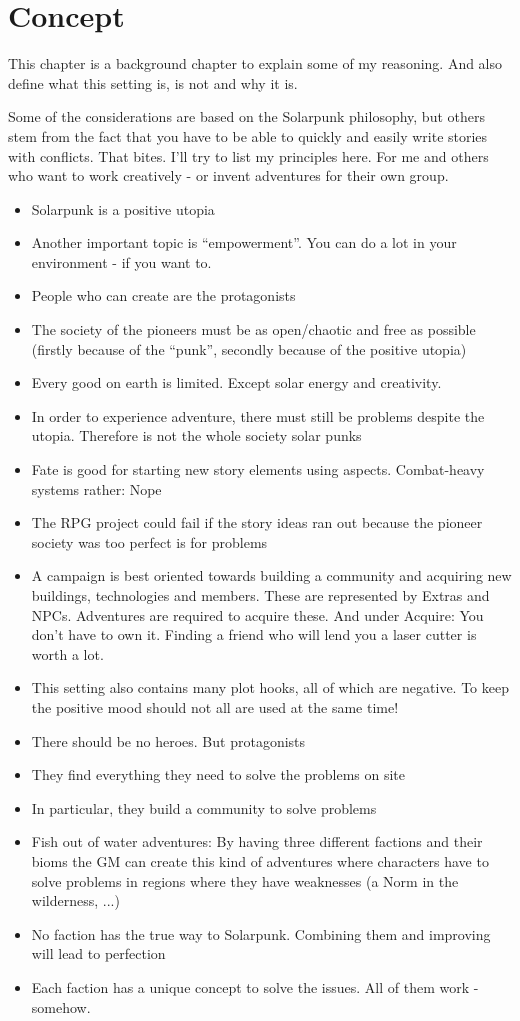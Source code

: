 \chapter{Concept}

This chapter is a background chapter to explain some of my reasoning. And also define what this setting is, is not and why it is.

Some of the considerations are based on the Solarpunk philosophy, but others stem from the fact that
you have to be able to quickly and easily write stories with conflicts. That bites. I'll try to list my principles here. For me and others who want to work creatively - or invent adventures for their own group.

\begin{itemize}
\item Solarpunk is a positive utopia
\item Another important topic is “empowerment”. You can do a lot in your environment - if you want to.
\item People who can create are the protagonists
\item The society of the pioneers must be as open/chaotic and free as possible (firstly because of the “punk”, secondly
because of the positive utopia)
\item Every good on earth is limited. Except solar energy and creativity.
\item In order to experience adventure, there must still be problems despite the utopia. Therefore is not the whole society
solar punks
\item Fate is good for starting new story elements using aspects. Combat-heavy systems rather: Nope
\item The RPG project could fail if the story ideas ran out because the pioneer society was too perfect
is for problems
\item A campaign is best oriented towards building a community and acquiring new buildings, technologies and
members. These are represented by Extras and NPCs. Adventures are required to acquire these. And under
Acquire: You don't have to own it. Finding a friend who will lend you a laser cutter is worth a lot.
\item This setting also contains many plot hooks, all of which are negative. To keep the positive mood should
not all are used at the same time!
\item There should be no heroes. But protagonists
\item They find everything they need to solve the problems on site
\item In particular, they build a community to solve problems
\item Fish out of water adventures: By having three different factions and their bioms the GM can create this kind of adventures where characters have to solve problems in regions where they have weaknesses (a Norm in the wilderness, ...) 
\item No faction has the true way to Solarpunk. Combining them and improving will lead to perfection
\item Each faction has a unique concept to solve the issues. All of them work - somehow.
\end{itemize}


